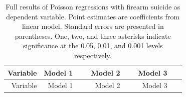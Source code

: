 \documentclass[]{article}
\begin{document}
\begin{longtable}[c]{@{}rrrrrrr@{}}
\caption{Full results of Poisson regressions with firearm suicide as
dependent variable. Point estimates are coefficients from linear model.
Standard errors are presented in parentheses. One, two, and three
asterisks indicate significance at the 0.05, 0.01, and 0.001 levels
respectively.}\tabularnewline
\toprule
\begin{minipage}[b]{0.12\columnwidth}\raggedleft\strut
Variable
\strut\end{minipage} &
\begin{minipage}[b]{0.11\columnwidth}\raggedleft\strut
Model 1
\strut\end{minipage} &
\begin{minipage}[b]{0.12\columnwidth}\raggedleft\strut
~
\strut\end{minipage} &
\begin{minipage}[b]{0.11\columnwidth}\raggedleft\strut
Model 2
\strut\end{minipage} &
\begin{minipage}[b]{0.12\columnwidth}\raggedleft\strut
~
\strut\end{minipage} &
\begin{minipage}[b]{0.11\columnwidth}\raggedleft\strut
Model 3
\strut\end{minipage} &
\begin{minipage}[b]{0.11\columnwidth}\raggedleft\strut
~
\strut\end{minipage}\tabularnewline
\midrule
\endfirsthead
\toprule
\begin{minipage}[b]{0.12\columnwidth}\raggedleft\strut
Variable
\strut\end{minipage} &
\begin{minipage}[b]{0.11\columnwidth}\raggedleft\strut
Model 1
\strut\end{minipage} &
\begin{minipage}[b]{0.12\columnwidth}\raggedleft\strut
~
\strut\end{minipage} &
\begin{minipage}[b]{0.11\columnwidth}\raggedleft\strut
Model 2
\strut\end{minipage} &
\begin{minipage}[b]{0.12\columnwidth}\raggedleft\strut
~
\strut\end{minipage} &
\begin{minipage}[b]{0.11\columnwidth}\raggedleft\strut
Model 3
\strut\end{minipage} &
\begin{minipage}[b]{0.11\columnwidth}\raggedleft\strut

\end{minipage}
\end{longtable}
\end{document}
